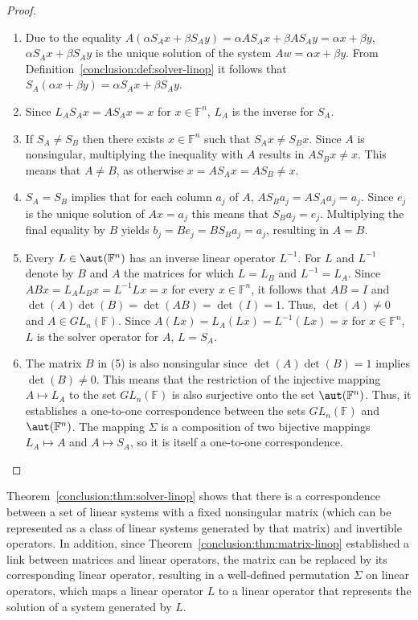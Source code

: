 \begin{proof}~\\
\begin{enumerate}
\item Due to the equality $A(\alpha S_A x + \beta S_A y) = \alpha A S_A x +
\beta A S_A y = \alpha x + \beta y$, $\alpha S_A x + \beta S_A y$ is the
unique solution of the system $Aw = \alpha x + \beta y$. From
Definition~\ref{conclusion:def:solver-linop} it follows that $S_A(\alpha x +
\beta y) = \alpha S_A x + \beta S_A y$.
\item Since $L_A S_A x = A S_A x = x$ for $x \in \mathbb{F}^n$, $L_A$ is the
inverse for $S_A$.
\item If $S_A \neq S_B$ then there exists $x \in \mathbb{F}^n$ such that $S_A x
\neq S_B x$. Since $A$ is nonsingular, multiplying the inequality with $A$
results in $A S_B x \neq x$. This means that $A \neq B$, as otherwise $x = A S_A
x = A S_B \neq x$.
\item $S_A = S_B$ implies that for each column $a_j$ of $A$, $A S_B a_j = A S_A
a_j = a_j$. Since $e_j$ is the unique solution of $Ax = a_j$ this means that
$S_B a_j = e_j$. Multiplying the final equality by $B$ yields $b_j = B e_j = B
S_B a_j = a_j$, resulting in $A = B$.
\item Every $L \in \aut(\mathbb{F}^n)$ has an inverse linear operator $L^{-1}$.
For $L$ and $L^{-1}$ denote by $B$ and $A$ the matrices for which $L = L_B$ and
$L^{-1} = L_A$. Since $ABx = L_A L_B x = L^{-1}Lx = x$ for every
$x \in \mathbb{F}^n$, it follows that $AB = I$ and $\det(A)\det(B) = \det(AB) =
\det(I) = 1$. Thus, $\det(A) \neq 0$ and $A \in GL_n(\mathbb{F})$. Since $A(Lx)
= L_A(Lx) = L^{-1}(Lx) = x$ for $x \in \mathbb{F}^n$, $L$ is the solver operator
for $A$, \ie $L = S_A$.
\item The matrix $B$ in (5) is also nonsingular since $\det(A)\det(B) = 1$
implies $\det(B) \neq 0$. This means that the restriction of the injective
mapping $A \mapsto L_A$ to the set $GL_n(\mathbb{F})$ is also surjective onto
the set $\aut(\mathbb{F}^n)$. Thus, it establishes a one-to-one correspondence
between the sets $GL_n(\mathbb{F})$ and $\aut(\mathbb{F}^n)$.  The mapping
$\Sigma$ is a composition of two bijective mappings $L_A \mapsto A$ and $A
\mapsto S_A$, so it is itself a one-to-one correspondence.
\end{enumerate}
\end{proof}

Theorem~\ref{conclusion:thm:solver-linop} shows that there is a correspondence
between a set of linear systems with a fixed nonsingular matrix (which can be
represented as a class of linear systems generated by that matrix) and
invertible operators.  In addition, since
Theorem~\ref{conclusion:thm:matrix-linop} established a link between matrices
and linear operators, the matrix can be replaced by its corresponding linear
operator, resulting in a well-defined permutation $\Sigma$ on linear operators,
which maps a linear operator $L$ to a linear operator that represents the
solution of a system generated by $L$.

